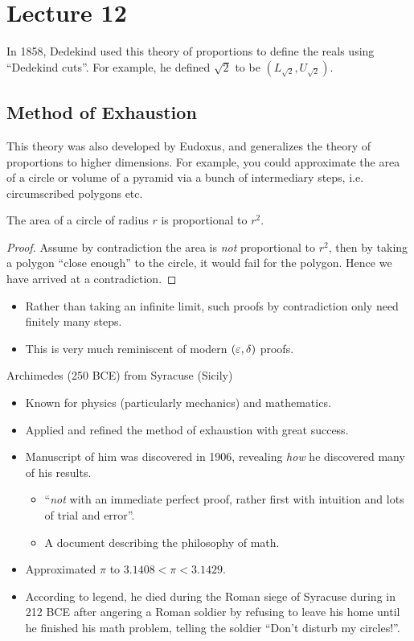 \documentclass[class=article, crop=false]{standalone}
\begin{document}
  \section{Lecture 12}
  \begin{note}{}
    In 1858, Dedekind used this theory of proportions to define the reals using ``Dedekind cuts''. For example, he defined $\sqrt{2}$ to be $(L_{\sqrt{2}}, U_{\sqrt{2}})$.
  \end{note}
  \subsection{Method of Exhaustion}
  This theory was also developed by Eudoxus, and generalizes the theory of proportions to higher dimensions. For example, you could approximate the area of a circle or volume of a pyramid via a bunch of intermediary steps, i.e. circumscribed polygons etc. \par
  \begin{theorem}{}
    The area of a circle of radius $r$ is proportional to $r^2$.
    \begin{proof}
      Assume by contradiction the area is \emph{not} proportional to $r^2$, then by taking a polygon ``close enough'' to the circle, it would fail for the polygon. Hence we have arrived at a contradiction.
    \end{proof}
  \end{theorem}
  \begin{note}{}
    \begin{itemize}
      \item Rather than taking an infinite limit, such proofs by contradiction only need finitely many steps.
      \item This is very much reminiscent of modern $(\varepsilon,\delta)$ proofs.
    \end{itemize}
  \end{note}
  Archimedes (250 BCE) from Syracuse (Sicily)
  \begin{itemize}
    \item Known for physics (particularly mechanics) and mathematics.
    \item Applied and refined the method of exhaustion with great success.
    \item Manuscript of him was discovered in 1906, revealing \emph{how} he discovered many of his results.
    \begin{itemize}
      \item ``\emph{not} with an immediate perfect proof, rather first with intuition and lots of trial and error''.
      \item A document describing the philosophy of math.
    \end{itemize}
    \item Approximated $\pi$ to $3.1408 < \pi < 3.1429$.
    \item According to legend, he died during the Roman siege of Syracuse during in 212 BCE after angering a Roman soldier by refusing to leave his home until he finished his math problem, telling the soldier ``Don't disturb my circles!''.
  \end{itemize}
\end{document}
